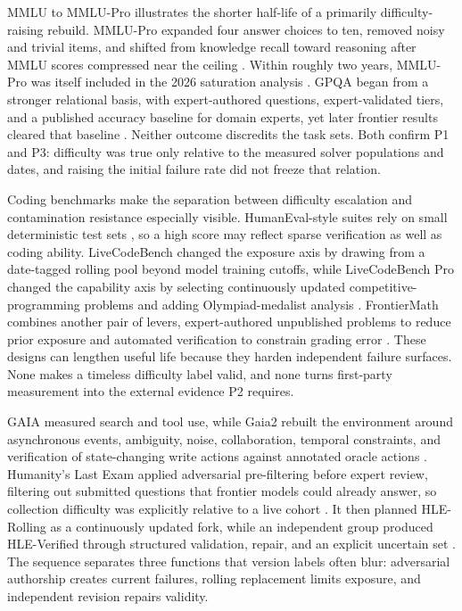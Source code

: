 \documentclass[11pt]{article}
\begin{document}
MMLU to MMLU-Pro illustrates the shorter half-life of a primarily difficulty-raising rebuild. MMLU-Pro expanded four answer choices to ten, removed noisy and trivial items, and shifted from knowledge recall toward reasoning after MMLU scores compressed near the ceiling \citep{wang2024mmlupro}. Within roughly two years, MMLU-Pro was itself included in the 2026 saturation analysis \citep{akhtar2026when}. GPQA began from a stronger relational basis, with expert-authored questions, expert-validated tiers, and a published accuracy baseline for domain experts, yet later frontier results cleared that baseline \citep{rein2023gpqa, akhtar2026when}. Neither outcome discredits the task sets. Both confirm P1 and P3: difficulty was true only relative to the measured solver populations and dates, and raising the initial failure rate did not freeze that relation.

Coding benchmarks make the separation between difficulty escalation and contamination resistance especially visible. HumanEval-style suites rely on small deterministic test sets \citep{chen2021evaluating}, so a high score may reflect sparse verification as well as coding ability. LiveCodeBench changed the exposure axis by drawing from a date-tagged rolling pool beyond model training cutoffs, while LiveCodeBench Pro changed the capability axis by selecting continuously updated competitive-programming problems and adding Olympiad-medalist analysis \citep{jain2024livecodebench, zheng2025livecodebenchpro}. FrontierMath combines another pair of levers, expert-authored unpublished problems to reduce prior exposure and automated verification to constrain grading error \citep{glazer2024frontiermath}. These designs can lengthen useful life because they harden independent failure surfaces. None makes a timeless difficulty label valid, and none turns first-party measurement into the external evidence P2 requires.

GAIA measured search and tool use, while Gaia2 rebuilt the environment around asynchronous events, ambiguity, noise, collaboration, temporal constraints, and verification of state-changing write actions against annotated oracle actions \citep{froger2025gaia2}. Humanity's Last Exam applied adversarial pre-filtering before expert review, filtering out submitted questions that frontier models could already answer, so collection difficulty was explicitly relative to a live cohort \citep{phan2025hle}. It then planned HLE-Rolling as a continuously updated fork, while an independent group produced HLE-Verified through structured validation, repair, and an explicit uncertain set \citep{zhai2026hleverified}. The sequence separates three functions that version labels often blur: adversarial authorship creates current failures, rolling replacement limits exposure, and independent revision repairs validity.
\end{document}
